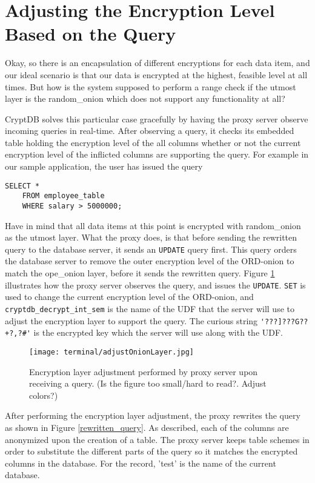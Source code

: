 \section{Adjusting the Encryption Level Based on the Query}
\label{adjust_enc_level}

Okay, so there is an encapsulation of different encryptions for each data item, and our ideal scenario is that our data is encrypted at the highest, feasible level at all times.  But how is the system supposed to perform a range check if the utmost layer is the \gls{random_onion} which does not support any functionality at all?

CryptDB solves this particular case gracefully by having the proxy server observe incoming queries in real-time. After observing a query, it checks its embedded table holding the encryption level of the all columns whether or not the current encryption level of the inflicted columns are supporting the query. For example in our sample application, the user has issued the query 
\begin{verbatim}
SELECT *
	FROM employee_table
	WHERE salary > 5000000;
\end{verbatim}

Have in mind that all data items at this point is encrypted with \gls{random_onion} as the utmost layer. What the proxy does, is that before sending the rewritten query to the database server, it sends an \verb!UPDATE! query first. This query orders the database server to remove the outer encryption level of the ORD-onion to match the \gls{ope_onion} layer, before it sends the rewritten query. Figure \ref{ope_layer_adjustment} illustrates how the proxy server observes the query, and issues the \verb!UPDATE!. \verb!SET! is used to change the current encryption level of the ORD-onion, and \verb!cryptdb_decrypt_int_sem! is the name of the UDF that the server will use to adjust the encryption layer to  support the query. The curious string \verb!'???]???G??+?,?#'! is the encrypted key which the server will use along with the UDF.

\begin{figure}[h]
	\texttt{[image: terminal/adjustOnionLayer.jpg]}
	\caption{Encryption layer adjustment performed by proxy server upon receiving a query. (Is the figure too small/hard to read?. Adjust colors?)}
	\label{ope_layer_adjustment}
\end{figure}

After performing the encryption layer adjustment, the proxy rewrites the query as shown in Figure \ref{rewritten_query}. As described, each of the columns are anonymized upon the creation of a table. The proxy server keeps table schemes in order to substitute the different parts of the query so it matches the encrypted columns in the database. For the record, 'test' is the name of the current database.  

